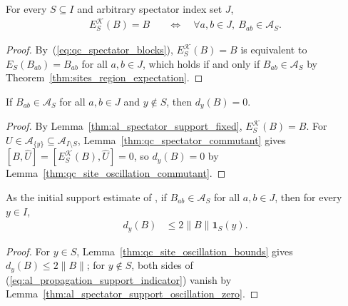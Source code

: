 \begin{lemma}
    \label{thm:al_spectator_support_fixed}
    \leanok
    For every $S\subseteq I$ and arbitrary spectator index set $J$,
    \begin{align}
        E_S^{\mathcal K}(B)=B
         & \quad\Longleftrightarrow\quad
        \forall a,b\in J,\ B_{ab}\in\mathcal A_S.
        \label{eq:al_propagation_support_fixed}
    \end{align}
\end{lemma}
\begin{proof}
    \leanok
    By~(\ref{eq:qc_spectator_blocks}), $E_S^{\mathcal K}(B)=B$ is equivalent
    to $E_S(B_{ab})=B_{ab}$ for all $a,b\in J$, which holds if and only if
    $B_{ab}\in\mathcal A_S$ by Theorem~\ref{thm:sites_region_expectation}.
\end{proof}

\begin{lemma}
    \label{thm:al_spectator_support_oscillation_zero}
    \leanok
    If $B_{ab}\in\mathcal A_S$ for all $a,b\in J$ and $y\notin S$, then
    $d_y(B)=0$.
\end{lemma}
\begin{proof}
    \leanok
    By Lemma~\ref{thm:al_spectator_support_fixed}, $E_S^{\mathcal K}(B)=B$.
    For $U\in\mathcal A_{\{y\}}\subseteq\mathcal A_{I\setminus S}$,
    Lemma~\ref{thm:qc_spectator_commutant} gives
    $[B,\widehat U]=[E_S^{\mathcal K}(B),\widehat U]=0$, so $d_y(B)=0$ by
    Lemma~\ref{thm:qc_site_oscillation_commutant}.
\end{proof}

\begin{lemma}
    \label{thm:al_spectator_support_indicator}
    \leanok
    As the initial support estimate of
    \cite{OpenAI2026AreaLaw}, if $B_{ab}\in\mathcal A_S$ for all
    $a,b\in J$, then for every $y\in I$,
    \begin{align}
        d_y(B) & \le2\|B\|\mathbf1_S(y).
        \label{eq:al_propagation_support_indicator}
    \end{align}
\end{lemma}
\begin{proof}
    \leanok
    For $y\in S$, Lemma~\ref{thm:qc_site_oscillation_bounds} gives
    $d_y(B)\le2\|B\|$; for $y\notin S$, both sides of
    (\ref{eq:al_propagation_support_indicator}) vanish by
    Lemma~\ref{thm:al_spectator_support_oscillation_zero}.
\end{proof}
